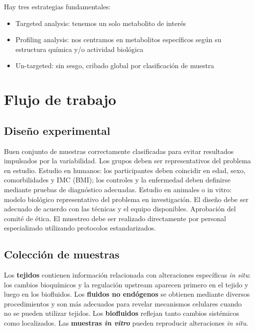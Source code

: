 Hay tres estrategias fundamentales:
\begin{itemize}
\item Targeted analysis: tenemos un solo metabolito de interés
\item Profiling analysis: nos centramos en metabolitos específicos según su estructura química y/o actividad biológica
\item Un-targeted: sin sesgo, cribado global por clasificación de muestra
\end{itemize}

\section{Flujo de trabajo}
\subsection{Diseño experimental}
Buen conjunto de muestras correctamente clasificadas para evitar resultados impulsados por la variabilidad. Los grupos deben ser representativos del problema en estudio. Estudio en humanos: los participantes deben coincidir en edad, sexo, comorbilidades y IMC (BMI); los controles y la enfermedad deben definirse mediante pruebas de diagnóstico adecuadas. Estudio en animales o in vitro: modelo biológico representativo del problema en investigación. El diseño debe ser adecuado de acuerdo con las técnicas y el equipo disponibles. Aprobación del comité de ética. El muestreo debe ser realizado directamente por personal especializado utilizando protocolos estandarizados.

\subsection{Colección de muestras}
Los \textbf{tejidos} contienen información relacionada con alteraciones específicas \textit{in situ}: los cambios bioquímicos y la regulación upstream aparecen primero en el tejido y luego en los biofluidos.
Los \textbf{fluidos no endógenos} se obtienen mediante diversos procedimientos y son más adecuados para revelar mecanismos celulares cuando no se pueden utilizar tejidos.
Los \textbf{biofluidos} reflejan tanto cambios sistémicos como localizados.
Las \textbf{muestras \textit{in vitro}} pueden reproducir alteraciones \textit{in situ}.

